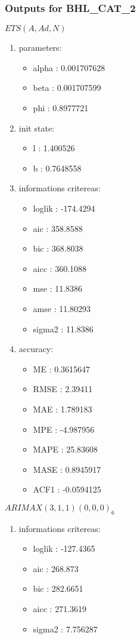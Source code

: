 \documentclass[10pt,a4paper]{article}\usepackage[]{graphicx}\usepackage[]{color}
\newcommand{\AaA}{\_}
\begin{document}
\subsubsection{Outputs for BHL\AaA CAT\AaA 2}
\begin{multicols}{2}


$ ETS(A,Ad,N) $
\begin{enumerate}
\item parameters:
\begin{itemize}
\item  alpha :  0.001707628 
\item  beta :  0.001707599 
\item  phi :  0.8977721 
\end{itemize}
\item init state:
\begin{itemize}
\item  l :  1.400526 
\item  b :  0.7648558 
\end{itemize}
\item informations critereas:
\begin{itemize}
\item  loglik :  -174.4294 
\item  aic :  358.8588 
\item  bic :  368.8038 
\item  aicc :  360.1088 
\item  mse :  11.8386 
\item  amse :  11.80293 
\item  sigma2 :  11.8386 
\end{itemize}
\item accuracy:
\begin{itemize}
\item  ME :  0.3615647 
\item  RMSE :  2.39411 
\item  MAE :  1.789183 
\item  MPE :  -4.987956 
\item  MAPE :  25.83608 
\item  MASE :  0.8945917 
\item  ACF1 :  -0.0594125 
\end{itemize}
\end{enumerate}

\columnbreak


 $ARIMAX(3,1,1)(0,0,0)_{6}$ 
\begin{enumerate}
\item informations critereas:
\begin{itemize}
\item  loglik :  -127.4365 
\item  aic :  268.873 
\item  bic :  282.6651 
\item  aicc :  271.3619 
\item  sigma2 :  7.756287 
\end{itemize}


\end{enumerate}
\end{multicols}
\end{document}
